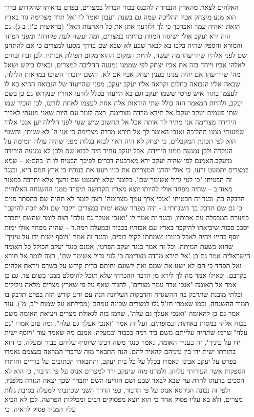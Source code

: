 \documentclass[12pt, openany]{book}
\begin{document}
האלהים לצאת מהארץ הנבחרה להכנס בכור הברזל במצרים, בפרט בראותו שהקדוש ברוך הוא מנע מיצחק אביו ההליכה שמה גם בשנת רעבון ואמר לו "אל תרד מצרימה גור בארץ הזאת ואהיה עמך ואברכך כי לך ולזרעך אתן את כל הארצות האל" (בראשית כ"ו, ב-ג). גם היה ירא יעקב אולי ישיגהו המוות בהיותו במצרים, ומה יעשה לעת פקודה? ומפני הפחד והמורא והספק שהיה בלבו בא לבאר שבע לא שבא שם בדרך מסעו למצרים כי אם להתחנן שם לפני אלהיו שיודיעהו מה יעשה, להיות המקום ההוא מקום תפילת אבותיו. לכן זבח זבחים לאלהי אביו וייחד בזה את אביו יצחק לפי שממנו נמנעה ההליכה למצרים, וכאילו ביקש ושאל מה' שיודיעהו אם יהיה ענינו כענין יצחק אביו אם לא. והשם יתברך השיבו במראות הלילה, שבאה אליו הנבואה בחלום וקראה אליו יעקב יעקב, מפני שהייעוד של הנבואה ההיא בא לו לעצמו בתור איש פרטי ששמו יעקב וגם בא הייעוד בכלל לזרעו אחריו שנקראו גם כן בשם יעקב, ולהיות המאמר הזה כולל שתי הודאות אלה אחת לעצמו לאחת לזרעו, לכן הזכיר שמו שתי פעמים יעקב יעקב! אל תירא מרדה מצרימה, רצה לומר עם היות שאני מנעתי לאביך הירידה מצרימה אני מתיר לך אותה אבל אל תחשוב שיש שגוי לפני הלילה יען אנכי אלהי שמנעתי ממנו ההליכה ואנכי האומר לך אל תירא מרדה מצרימה כי אני ה' לא שגיתי, והשגוי הוא לפי תכונת המקבלים, כי יצחק לא היה ראוי לבוא בגלות מפני שהיה עולה תמימה על העקדה ולכן נמנעה ממנו הירידה, אבל יעקב עתיד היה לבוא שם ולכן לא נמנעה הירידה מיעקב.האמנם לפי שהיה יעקב ירא מארבעה דברים לפיכך הבטיח לו ה' בהם:א – שמא במצרים יתמעט זרעו,  כי אולי יהרגו המצריים את בניו ויענו את בנותיו כי ארץ חמס היא, וכנגד זה הבטיחו "כי לגוי גדול אשימך שם", כלומר שלא יתמעט שם זרעך אלא יתרבה במאוד מאוד.ב – שהיה מפחד אולי להיותו יוצא מארץ הקדושה תיפרד ממנו ההשגחה האלוהית הדבקה בה, וכגד זה הבטיחו "אנכי ארך עמך מצרימה" רצה לומר לא תהיה שם בהסתר פנים כי גם שם תדבק בך השגחתי.ג - היה מפחד שמא ימות במצרים ויקבר שם ולא יזכה להיקבר במערת המכפלה עם אבותיו, וכנגד זה אמר לו "ואנכי אעלך גם עלה" רצה לומר שהשם יתברך יסבב סבות שיביאהו להיקבר בארץ עם אבותיו בכבוד ובמעלה רמה.ד – שהיה מפחד אולי ימות יוסף בחייו ויהיה לאבל כינורו ושמחתו לקול בוכים, וכנגד זה אמר "ויוסף ישית ידו על עיניך" שהוא בשעת המיתה. וכל זה אמר כנגד יעקב הפרטי, אמנם כנגד יעקב הכולל כל האומה הישראלית אמר גם כן "אל תירא מרדה מצרימה כי לגוי גדול אשימך שם", רצה לומר אל תירא ואל תפחד כי הם לא ישנו את שמם ואת לשונם וחותם ברית קודש על בשרם ויראת אלהים בקרבם. וכאילו אמר מה לך לירא מן הדבר ההכרחי שלא תוכל להימלט ממנו בשום צד. גם כן אמר אל האומה "אנכי ארד עמך מצרים", להגיד שאף על פי שארץ מצרים מלאה גילולים ובלתי מובנת שתדבק בה ההשגחה והדבקות העליונה הנה עם זרע קודש הזה בפרט תדבק בו תמיד ההשגחה, וכמו שאמרו חז"ל גלו למצרים שכינה עמהם (מכילתא על שמות י"ב, מ'). עוד אמר גם כן להאומה "ואנכי אעלך גם עלה", שרמז בזה לגאולת מצרים ויציאת האומה משם בכוח אלהי במסות באותות ובמופתים, ועל זה אמר "ואנכי אעלך גם עלה". ומה טוב אמרו "גם עלה" שרמז שתהיה עלייתם משם ביד רמה בכבוד ובמעלה. אמנם מה שאמר עוד "ויוסף ישית ידו על עיניך", זה בעניין האומה, נאמר כנגד משה רבינו שיוסיף עליהם כבוד ומעלה, כי הוא בתורתו ישית ידו בין עיניהם להאיר להם.  הנה התבאר מזה שדברי המראה בעצמם נאמרו בפרט על יעקב אבינו ונאמרו בכלל על כל בית יעקב, והתבארו הכתובים על בוריים והותרו הספקות אשר העירותי עליהן. ולמדנו מזה שיעקב ירד למצרים אנוס על פי הדבור, כי הוא לא הסכים בדעתו לרדת עד שבא לבאר שבע ושם הודיעו השם יתברך שכך יצאה הגזרה מלפניו. ולפי זה נכונה הגירסא אנוס על פי הדבור, כפי הדרך השני שכתבתי למעלה בסיבת גלות מצרים, ולא בא עליו פסוק אחד כי הוא יוצא מפסוקים רבים ומכללות הפרשה, לכן לא הביא עליו המגיד פסוק לראיה, כי 
\end{document}
